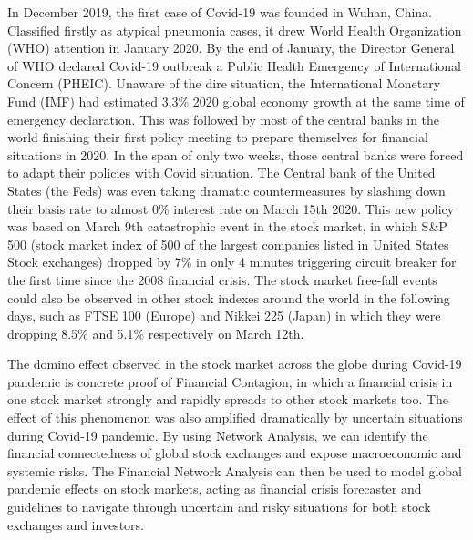 \documentclass[a4paper,11pt]{article}
\begin{document}
In December 2019, the first case of Covid-19 was founded in Wuhan, China. 
Classified firstly as atypical pneumonia cases, it drew World Health Organization (WHO) attention in January 2020.
By the end of January, the Director General of WHO declared Covid-19 outbreak a Public Health Emergency of International Concern (PHEIC).  \cite{WHOTimeline} 
Unaware of the dire situation, the International Monetary Fund (IMF) had estimated 3.3\% 2020 global economy growth at the same time of emergency declaration. \cite{IMFEstimation} 
This was followed by most of the central banks in the world finishing their first policy meeting to prepare themselves for financial situations in 2020. \cite{CentralBankTimeline}
In the span of only two weeks, those central banks were forced to adapt their policies with Covid situation. The Central bank of the United States (the Feds) was even taking dramatic countermeasures by slashing down their basis rate to almost 0\% interest rate on March 15th 2020. This new policy was based on March 9th catastrophic event in the stock market, in which S&P 500 (stock market index of 500 of the largest companies listed in United States Stock exchanges) dropped by 7\% in only 4 minutes triggering circuit breaker for the first time since the 2008 financial crisis. \cite{SAMITAS2022102005} 
The stock market free-fall events could also be observed in other stock indexes around the world in the following days, such as FTSE 100 (Europe) and Nikkei 225 (Japan) in which they were dropping 8.5\% and 5.1\% respectively on March 12th.

The domino effect observed in the stock market across the globe during Covid-19 pandemic is concrete proof of Financial Contagion, in which a financial crisis in one stock market strongly and rapidly spreads to other stock markets too. \cite{KOLLMANN2013139} 
The effect of this phenomenon was also amplified dramatically by uncertain situations during Covid-19 pandemic. By using Network Analysis, we can identify the financial connectedness of global stock exchanges and expose macroeconomic and systemic risks. \cite{RIZWAN2020101682}
The Financial Network Analysis can then be used to model global pandemic effects on stock markets, acting as financial crisis forecaster and guidelines to navigate through uncertain and risky situations for both stock exchanges and investors. 
\end{document}
